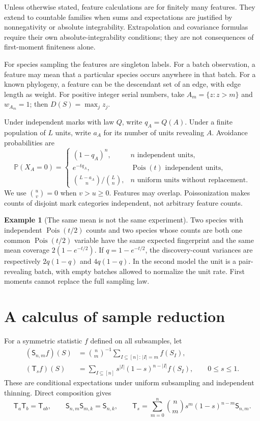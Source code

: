 \documentclass[11pt]{article}
\numberwithin{equation}{section}
\theoremstyle{definition}
\newtheorem{example}[example]{Example}
\theoremstyle{remark}
\newcommand{\Pp}{\mathbb P}
\newcommand{\Scal}{\mathsf S}
\newcommand{\Tcal}{\mathsf T}
\newcommand{\Pois}{\operatorname{Pois}}
\begin{document}
Unless otherwise stated, feature calculations are for finitely many features. They extend to countable families when sums and expectations are justified by nonnegativity or absolute integrability. Extrapolation and covariance formulas require their own absolute-integrability conditions; they are not consequences of first-moment finiteness alone.

For species sampling the features are singleton labels. For a batch observation, a feature may mean that a particular species occurs anywhere in that batch. For a known phylogeny, a feature can be the descendant set of an edge, with edge length as weight. For positive integer serial numbers, take $A_m=\{z:z>m\}$ and $w_{A_m}=1$; then $D(S)=\max_jz_j$.

Under independent marks with law $Q$, write $q_A=Q(A)$. Under a finite population of $L$ units, write $a_A$ for its number of units revealing $A$. Avoidance probabilities are
\begin{equation}\label{eq:void}
 \Pp(X_A=0)=
 \begin{cases}
 (1-q_A)^n,&n\text{ independent units},\\
 e^{-tq_A},&\Pois(t)\text{ independent units},\\
 \binom{L-a_A}{n}/\binom Ln,&n\text{ uniform units without replacement}.
 \end{cases}
\end{equation}
We use $\binom uv=0$ when $v>u\ge0$. Features may overlap. Poissonization makes counts of disjoint mark categories independent, not arbitrary feature counts.

\begin{example}[The same mean is not the same experiment]\label{ex:dependence}
Two species with independent $\Pois(t/2)$ counts and two species whose counts are both one common $\Pois(t/2)$ variable have the same expected fingerprint and the same mean coverage $2(1-e^{-t/2})$. If $q=1-e^{-t/2}$, the discovery-count variances are respectively $2q(1-q)$ and $4q(1-q)$. In the second model the unit is a pair-revealing batch, with empty batches allowed to normalize the unit rate. First moments cannot replace the full sampling law.
\end{example}

\section{A calculus of sample reduction}\label{sec:sampling}
For a symmetric statistic $f$ defined on all subsamples, let
\begin{align}
 (\Scal_{n,m}f)(S)&=\binom nm^{-1}\sum_{I\subseteq[n]:\,|I|=m}f(S_I),\\
 (\Tcal_sf)(S)&=\sum_{I\subseteq[n]}s^{|I|}(1-s)^{n-|I|}f(S_I),\qquad 0\le s\le1.
\end{align}
These are conditional expectations under uniform subsampling and independent thinning. Direct composition gives
\begin{equation}\label{eq:semigroup}
 \Tcal_a\Tcal_b=\Tcal_{ab},\qquad
 \Scal_{n,m}\Scal_{m,k}=\Scal_{n,k},\qquad
 \Tcal_s=\sum_{m=0}^n\binom nm s^m(1-s)^{n-m}\Scal_{n,m}.
\end{equation}
\end{document}
